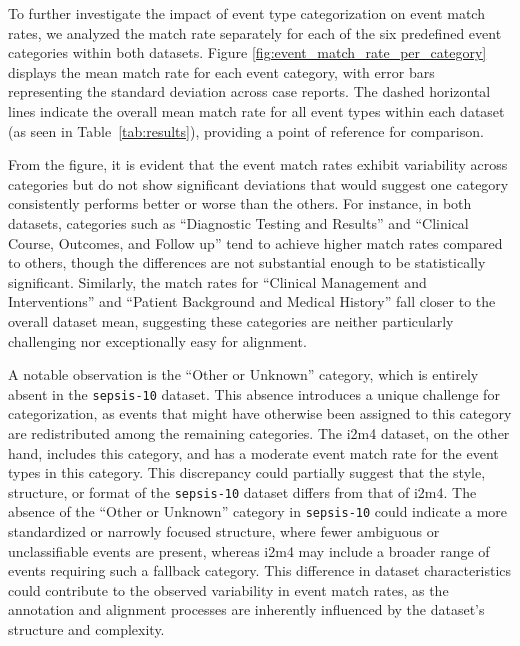 \documentclass[pmlr,twocolumn,10pt]{jmlr} %
\begin{document}
To further investigate the impact of event type categorization on event match rates, we analyzed the match rate separately for each of the six predefined event categories within both datasets.  
Figure \ref{fig:event_match_rate_per_category} displays the mean match rate for each event category, with error bars representing the standard deviation across case reports.  
The dashed horizontal lines indicate the overall mean match rate for all event types within each dataset (as seen in Table~\ref{tab:results}), providing a point of reference for comparison.

From the figure, it is evident that the event match rates exhibit variability across categories but do not show significant deviations that would suggest one category consistently performs better or worse than the others.  
For instance, in both datasets, categories such as ``Diagnostic Testing and Results'' and ``Clinical Course, Outcomes, and Follow up'' tend to achieve higher match rates compared to others, though the differences are not substantial enough to be statistically significant.  
Similarly, the match rates for ``Clinical Management and Interventions'' and ``Patient Background and Medical History'' fall closer to the overall dataset mean, suggesting these categories are neither particularly challenging nor exceptionally easy for alignment.

A notable observation is the ``Other or Unknown'' category, which is entirely absent in the \texttt{sepsis-10} dataset.  
This absence introduces a unique challenge for categorization, as events that might have otherwise been assigned to this category are redistributed among the remaining categories.  
The i2m4 dataset, on the other hand, includes this category, and has a moderate event match rate for the event types in this category.  
This discrepancy could partially suggest that the style, structure, or format of the \texttt{sepsis-10} dataset differs from that of i2m4.  
The absence of the ``Other or Unknown'' category in \texttt{sepsis-10} could indicate a more standardized or narrowly focused structure, where fewer ambiguous or unclassifiable events are present, whereas i2m4 may include a broader range of events requiring such a fallback category.  
This difference in dataset characteristics could contribute to the observed variability in event match rates, as the annotation and alignment processes are inherently influenced by the dataset's structure and complexity.  
\end{document}
